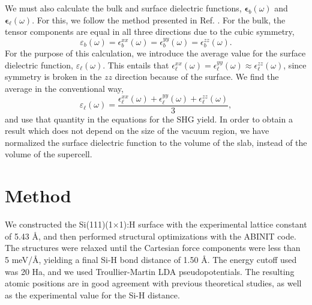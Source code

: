 \documentclass[prb,superscriptaddress,showpacs,twocolumn,letterpaper]{revtex4}
\begin{document}
We must also calculate the bulk and surface dielectric functions,
$\boldsymbol{\epsilon}_b(\omega)$ and $\boldsymbol{\epsilon}_\ell(\omega)$. For
this, we follow the method presented in Ref. . For the
bulk, the tensor components are equal in all three directions due to the cubic
symmetry,
\begin{equation*}
\varepsilon_{b}(\omega) = 
\epsilon^{xx}_{b}(\omega) = 
\epsilon^{yy}_{b}(\omega) = 
\epsilon^{zz}_{b}(\omega).
\end{equation*}
For the purpose of this calculation, we introduce the average value for the
surface dielectric function, $\varepsilon_\ell(\omega)$. This entails that
$\epsilon^{xx}_{\ell}(\omega) = \epsilon^{yy}_{\ell}(\omega) \approx
\epsilon^{zz}_{\ell}(\omega)$, since symmetry is broken in the $zz$ direction
because of the surface. We find the average in the conventional way,
\begin{equation*}
\varepsilon_{\ell}(\omega) = 
\frac{\epsilon^{xx}_{\ell}(\omega) + 
\epsilon^{yy}_{\ell}(\omega) + 
\epsilon^{zz}_{\ell}(\omega)}{3},
\end{equation*}
and use that quantity in the equations for the SHG yield. In order to obtain a
result which does not depend on the size of the vacuum
region,\cite{nicolasPRB15} we have normalized the surface dielectric function to
the volume of the slab, instead of the volume of the supercell.




\section{Method}\label{sec:method}

We constructed the Si(111)(1$\times$1):H surface with the experimental lattice
constant of 5.43 \AA, and then performed structural optimizations with the
ABINIT\cite{gonzeCPS09, abinit} code. The structures were relaxed until the
Cartesian force components were less than 5 meV/\AA, yielding a final Si-H bond
distance of 1.50 \AA. The energy cutoff used was 20 Ha, and we used
Troullier-Martin LDA pseudopotentials.\cite{troullierPRB91} The resulting atomic
positions are in good agreement with previous theoretical studies,
\cite{kaxirasPRB88, jonaPRB95, alfonsoPRB96, cargnoniJOCP00, mejiaPRB02} as well
as the experimental value for the Si-H distance.\cite{weastCRC88}
\end{document}
